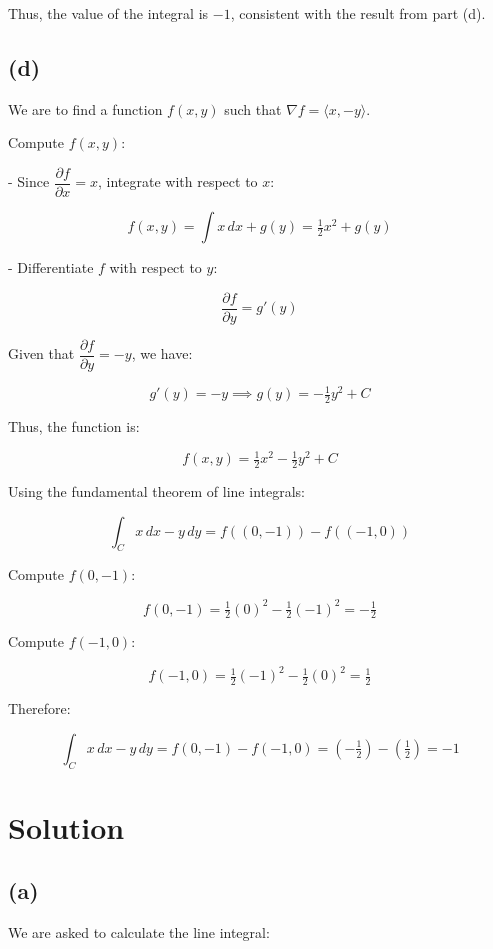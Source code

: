 \documentclass[11pt]{article}
\begin{document}
Thus, the value of the integral is $\boxed{-1}$, consistent with the result from part (d).

\newpage

\subsection{(d)}

We are to find a function $f(x, y)$ such that $\nabla f = \langle x, -y \rangle$.

Compute $f(x, y)$:

- Since $\dfrac{\partial f}{\partial x} = x$, integrate with respect to $x$:

\[
f(x, y) = \int x \, dx + g(y) = \tfrac{1}{2} x^2 + g(y)
\]

- Differentiate $f$ with respect to $y$:

\[
\dfrac{\partial f}{\partial y} = g'(y)
\]

Given that $\dfrac{\partial f}{\partial y} = -y$, we have:

\[
g'(y) = -y \implies g(y) = -\tfrac{1}{2} y^2 + C
\]

Thus, the function is:

\[
f(x, y) = \tfrac{1}{2} x^2 - \tfrac{1}{2} y^2 + C
\]

Using the fundamental theorem of line integrals:

\[
\int_C x \, dx - y \, dy = f\left( (0, -1) \right) - f\left( (-1, 0) \right)
\]

Compute $f(0, -1)$:

\[
f(0, -1) = \tfrac{1}{2} (0)^2 - \tfrac{1}{2} (-1)^2 = -\tfrac{1}{2}
\]

Compute $f(-1, 0)$:

\[
f(-1, 0) = \tfrac{1}{2} (-1)^2 - \tfrac{1}{2} (0)^2 = \tfrac{1}{2}
\]

Therefore:

\[
\int_C x \, dx - y \, dy = f(0, -1) - f(-1, 0) = \left( -\tfrac{1}{2} \right) - \left( \tfrac{1}{2} \right) = -1
\]

\newpage

\section{Solution}

\subsection{(a)}

We are asked to calculate the line integral:
\end{document}
